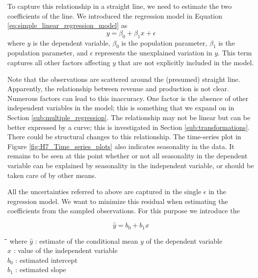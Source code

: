 To capture this relationship in a straight line, we need to estimate the two coefficients of the line. We introduced the regression model in Equation \ref{eq:simple_linear_regression_model} as
\begin{equation*}
  y = \beta_0 + \beta_1x + \epsilon
\end{equation*}
\noindent where $y$ is the dependent variable, $\beta_0$ is the population  parameter, $\beta_1$ is the population  parameter, and $\epsilon$ represents the unexplained variation in $y$. 
This term captures all other factors affecting $y$ that are not explicitly included in the model.

Note that the observations are scattered around the (presumed) straight line. Apparently, the relationship between revenue and production is not clear. Numerous factors can lead to this inaccuracy. One factor is the absence of other independent variables in the model; this is something that we expand on in Section \ref{sub:multiple_regression}. The relationship may not be linear but can be better expressed by a curve; this is investigated in Section \ref{sub:transformations}. There could be structural changes to this relationship. The time-series plot in Figure \ref{fig:H7_Time_series_plots} also indicates seasonality in the data. It remains to be seen at this point whether or not all seasonality in the dependent variable can be explained by seasonality in the independent variable, or should be taken care of by other means. 

All the uncertainties referred to above are captured in the single  $\epsilon$ in the regression model. 
We want to minimize this residual when estimating the coefficients from the sampled observations. For this purpose we introduce the 

\begin{equation}
\hat{y} = b_0 + b_1 x
\label{eq:regression_line}
\end{equation}

\noindent
\begin{tabbing}
\hspace*{1.2cm}\=\hspace*{0.4cm}\=\hspace*{0.2cm}\= \kill
where \> $\hat{y}$ \> : \> estimate of the conditional mean $y$ of the dependent variable \\
      \> $x$     \> : \> value of the independent variable \\
      \> $b_0$     \> : \> estimated intercept \\
      \> $b_1$     \> : \> estimated slope
\end{tabbing}


